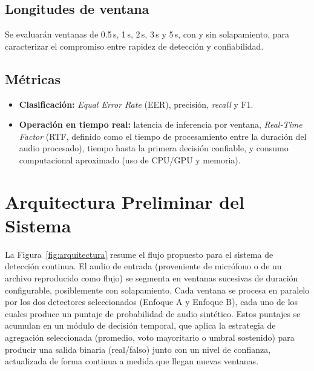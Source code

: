\documentclass[conference]{IEEEtran}
\begin{document}
\subsection{Longitudes de ventana}

Se evaluarán ventanas de 0.5\,s, 1\,s, 2\,s, 3\,s y 5\,s, con y sin solapamiento, para caracterizar el compromiso entre rapidez de detección y confiabilidad.

\subsection{Métricas}

\begin{itemize}
\item \textbf{Clasificación:} \emph{Equal Error Rate} (EER), precisión, \emph{recall} y F1.
\item \textbf{Operación en tiempo real:} latencia de inferencia por ventana, \emph{Real-Time Factor} (RTF, definido como el tiempo de procesamiento entre la duración del audio procesado), tiempo hasta la primera decisión confiable, y consumo computacional aproximado (uso de CPU/GPU y memoria).
\end{itemize}

\section{Arquitectura Preliminar del Sistema}

La Figura~\ref{fig:arquitectura} resume el flujo propuesto para el sistema de detección continua. El audio de entrada (proveniente de micrófono o de un archivo reproducido como flujo) se segmenta en ventanas sucesivas de duración configurable, posiblemente con solapamiento. Cada ventana se procesa en paralelo por los dos detectores seleccionados (Enfoque A y Enfoque B), cada uno de los cuales produce un puntaje de probabilidad de audio sintético. Estos puntajes se acumulan en un módulo de decisión temporal, que aplica la estrategia de agregación seleccionada (promedio, voto mayoritario o umbral sostenido) para producir una salida binaria (real/falso) junto con un nivel de confianza, actualizada de forma continua a medida que llegan nuevas ventanas.
\end{document}
